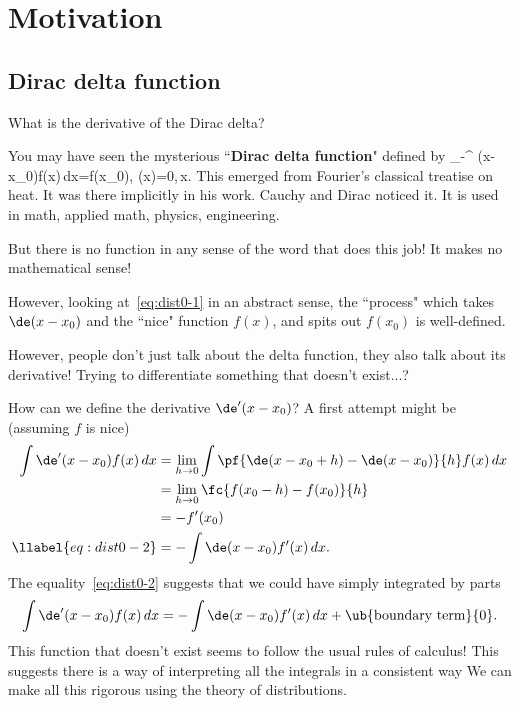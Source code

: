 \chapter{Motivation}

\section{Dirac delta function}

What is the derivative of the Dirac delta?

You may have seen the mysterious ``\textbf{Dirac delta function}" defined by 
\int_{-\iy}^{\iy} \de(x-x_0)f(x)\,dx=f(x_0), \qquad \de(x)=0,\,x.
\eeq
This emerged from Fourier's classical treatise on heat. It was there implicitly in his work. Cauchy and Dirac noticed it. It is used in math, applied math, physics, engineering.

But there is no function in any sense of the word that does this job! It makes no mathematical sense!

However, looking at~\eqref{eq:dist0-1} in an abstract sense, the ``process" which takes $\de(x-x_0)$ and the ``nice" function $f(x)$, and spits out $f(x_0)$ is well-defined.

However, people don't just talk about the delta function, they also talk about its derivative! Trying to differentiate something that doesn't exist...? %

How can we define the derivative $\de'(x-x_0)$? A first attempt might be (assuming $f$ is nice)
\begin{align}
\nonumber
\int \de'(x-x_0)f(x)\,dx&=\lim_{h\to 0} \int 
\pf{\de(x-x_0+h)-\de(x-x_0)}{h}f(x)\,dx\\
\nonumber
&=\lim_{h\to 0} \fc{f(x_0-h)-f(x_0)}{h}\\
\nonumber
&=-f'(x_0)\\
\llabel{eq:dist0-2}
&=-\int \de(x-x_0)f'(x)\,dx.
\end{align}
The equality~\eqref{eq:dist0-2} suggests that we could have simply integrated by parts
\[
\int \de'(x-x_0)f(x)\,dx=-\int \de(x-x_0)f'(x)\,dx+\ub{\text{boundary term}}{0}.
\]
This function that doesn't exist seems to follow the usual rules of calculus! 
This suggests there is a way of interpreting all the integrals in a consistent way
We can make all this rigorous using the theory of distributions. %

